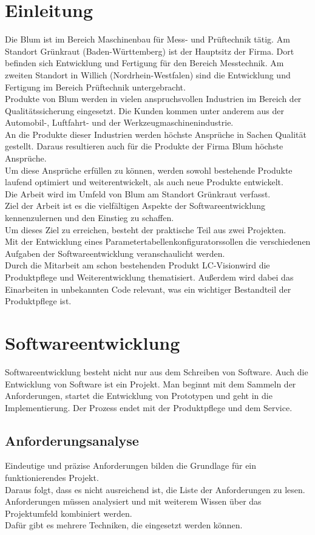 \documentclass[12pt,a4paper]{article}
\begin{document}
\section{Einleitung}
Die \ac{Blum} ist im Bereich Maschinenbau für Mess- und Prüftechnik tätig. Am Standort Grünkraut (Baden-Württemberg) ist der Hauptsitz der Firma. Dort befinden sich Entwicklung und Fertigung für den Bereich Messtechnik. Am zweiten Standort in Willich (Nordrhein-Westfalen) sind die Entwicklung und Fertigung im Bereich Prüftechnik untergebracht.\\
Produkte von \ac{Blum} werden in vielen anspruchsvollen Industrien im Bereich der Qualitätssicherung eingesetzt. Die Kunden kommen unter anderem aus der Automobil-, Luftfahrt- und der Werkzeugmaschinenindustrie. \\
An die Produkte dieser Industrien werden höchste Ansprüche in Sachen Qualität gestellt. Daraus resultieren auch für die Produkte der Firma \ac{Blum} höchste Ansprüche. \\
Um diese Ansprüche erfüllen zu können, werden sowohl bestehende Produkte laufend optimiert und weiterentwickelt, als auch neue Produkte entwickelt. \\
Die Arbeit wird im Umfeld von \ac{Blum} am Standort Grünkraut verfasst. \\
Ziel der Arbeit ist es die vielfältigen Aspekte der Softwareentwicklung kennenzulernen und den Einstieg zu schaffen.\\
Um dieses Ziel zu erreichen, besteht der praktische Teil aus zwei Projekten.\\
Mit der Entwicklung eines \glqq Parametertabellenkonfigurators\grqq\space sollen die verschiedenen Aufgaben der Softwareentwicklung veranschaulicht werden.\\
Durch die Mitarbeit am schon bestehenden Produkt \glqq LC-Vision\grqq\space wird die Produktpflege und Weiterentwicklung thematisiert. 
Außerdem wird dabei das Einarbeiten in unbekannten Code relevant, was ein wichtiger Bestandteil der Produktpflege ist.
\newpage   
\section{Softwareentwicklung}
Softwareentwicklung besteht nicht nur aus dem Schreiben von Software. Auch die Entwicklung von Software ist ein Projekt. Man beginnt mit dem Sammeln der Anforderungen, startet die Entwicklung von Prototypen und geht in die Implementierung. Der Prozess endet mit der Produktpflege und dem Service.  
\subsection{Anforderungsanalyse}
Eindeutige und präzise Anforderungen bilden die Grundlage für ein funktionierendes Projekt\cite{doi:10.1080/12460125.2016.1187390}. \\
Daraus folgt, dass es nicht ausreichend ist, die Liste der Anforderungen zu lesen. Anforderungen müssen analysiert und mit weiterem Wissen über das Projektumfeld kombiniert werden. \\
Dafür gibt es mehrere Techniken, die eingesetzt werden können. 
\end{document}
